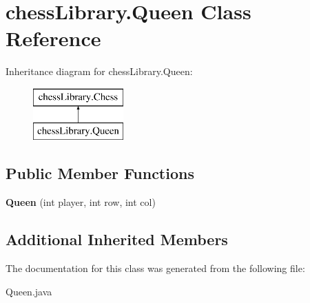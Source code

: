 \hypertarget{classchess_library_1_1_queen}{}\section{chess\+Library.\+Queen Class Reference}
\label{classchess_library_1_1_queen}
Inheritance diagram for chess\+Library.\+Queen\+:\begin{figure}[H]
\begin{center}
\leavevmode
\includegraphics[height=2.000000cm]{classchess_library_1_1_queen}
\end{center}
\end{figure}
\subsection*{Public Member Functions}
\begin{DoxyCompactItemize}
\item 
\mbox{\label{classchess_library_1_1_queen_a7e3627b5809de141b86895792a605ad1}} 
{\bfseries Queen} (int player, int row, int col)
\end{DoxyCompactItemize}
\subsection*{Additional Inherited Members}


The documentation for this class was generated from the following file\+:\begin{DoxyCompactItemize}
\item 
Queen.\+java\end{DoxyCompactItemize}
